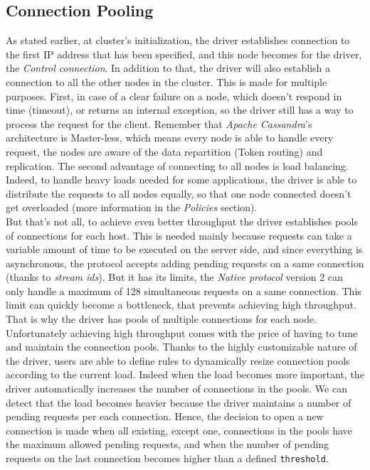 \documentclass[a4paper]{report}
\newcommand{\ca}{\emph{Apache Cassandra\xspace}}
\begin{document}
\subsection{Connection Pooling}
As stated earlier, at cluster's initialization, the driver establishes connection to the first IP address that has been specified, and this node becomes for the driver, the \emph{Control connection}. In addition to that, the driver will also establish a connection to all the other nodes in the cluster. This is made for multiple purposes. First, in case of a clear failure on a node, which doesn't respond in time (timeout), or returns an internal exception, so the driver still has a way to process the request for the client. Remember that \ca{}'s architecture is Master-less, which means every node is able to handle every request, the nodes are aware of the data repartition (Token routing) and replication. The second advantage of connecting to all nodes is load balancing. Indeed, to handle heavy loads needed for some applications, the driver is able to distribute the requests to all nodes equally, so that one node connected doesn't get overloaded (more information in the \emph{Policies} section).\\
But that's not all, to achieve even better throughput the driver establishes pools of connections for each host. This is needed mainly because requests can take a variable amount of time to be executed on the server side, and since everything is asynchronous, the protocol accepts adding pending requests on a same connection (thanks to \emph{stream ids}). But it has its limits, the \emph{Native protocol} version 2 can only handle a maximum of 128 simultaneous requests on a same connection. This limit can quickly become a bottleneck, that prevents achieving high throughput. That is why the driver has pools of multiple connections for each node.\\
Unfortunately achieving high throughput comes with the price of having to tune and maintain the connection pools. Thanks to the highly customizable nature of the driver, users are able to define rules to dynamically resize connection pools according to the current load. Indeed when the load becomes more important, the driver automatically increases the number of connections in the pools. We can detect that the load becomes heavier because the driver maintains a number of pending requests per each connection. Hence, the decision to open a new connection is made when all existing, except one, connections in the pools have the maximum allowed pending requests, and when the number of pending requests on the last connection becomes higher than a defined \verb;threshold;.\\
\end{document}

